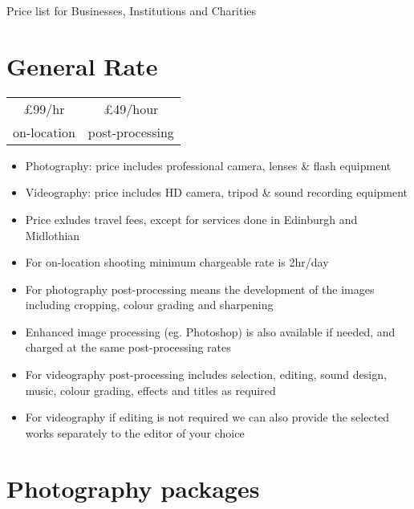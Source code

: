 \documentclass[10pt,a4paper,roman]{moderncv}
\title{\jobtitle}
\begin{document}
\makecvtitle

\vspace{-2.5em}

\begin{flushright}
{\large Price list for Businesses, Institutions and Charities}
\end{flushright}

\section{General Rate}

\vspace{1em}

\begin{center}
{\setlength{\tabcolsep}{2em}
\renewcommand{\arraystretch}{1.2}
\begin{tabular}{c c}
{\Large £99/hr} & {\Large £49/hour}  \\
on-location & post-processing
\end{tabular}
}
\end{center}

\begin{itemize}
\item Photography: price includes professional camera, lenses \& flash equipment
\item Videography: price includes HD camera, tripod \& sound recording equipment
\item Price exludes travel fees, except for services done in Edinburgh and Midlothian
\item For on-location shooting minimum chargeable rate is 2hr/day
\item For photography post-processing means the development of the images including cropping, colour grading and sharpening
\item Enhanced image processing (eg. Photoshop) is also available if needed, and charged at the same post-processing rates
\item For videography post-processing includes selection, editing, sound design, music, colour grading, effects and titles as required
\item For videography if editing is not required we can also provide the selected works separately to the editor of your choice
\end{itemize}

\vspace{2em}

\section{Photography packages}
\end{document}
